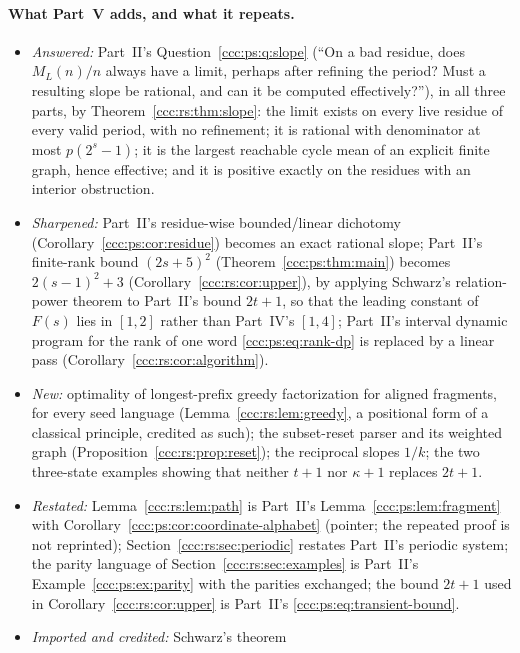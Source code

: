 \documentclass[11pt,letterpaper]{article}
\theoremstyle{definition}
\theoremstyle{remark}
\begin{document}
\paragraph{What Part~V adds, and what it repeats.}
\begin{itemize}[leftmargin=1.4em,itemsep=1pt]
\item \emph{Answered:} Part~II's Question~\ref{ccc:ps:q:slope} (``On a bad
 residue, does $M_L(n)/n$ always have a limit, perhaps after refining the
 period? Must a resulting slope be rational, and can it be computed
 effectively?''), in all three parts, by Theorem~\ref{ccc:rs:thm:slope}: the
 limit exists on every live residue of every valid period, with no
 refinement; it is rational with denominator at most $p(2^s-1)$; it is the
 largest reachable cycle mean of an explicit finite graph, hence effective;
 and it is positive exactly on the residues with an interior obstruction.
\item \emph{Sharpened:} Part~II's residue-wise bounded/linear dichotomy
 (Corollary~\ref{ccc:ps:cor:residue}) becomes an exact rational slope;
 Part~II's finite-rank bound $(2s+5)^2$ (Theorem~\ref{ccc:ps:thm:main})
 becomes $2(s-1)^2+3$ (Corollary~\ref{ccc:rs:cor:upper}), by applying
 Schwarz's relation-power theorem to Part~II's bound $2t+1$, so that the
 leading constant of $F(s)$ lies in $[1,2]$ rather than Part~IV's $[1,4]$;
 Part~II's interval dynamic program for the rank of one word
 \eqref{ccc:ps:eq:rank-dp} is replaced by a linear pass
 (Corollary~\ref{ccc:rs:cor:algorithm}).
\item \emph{New:} optimality of longest-prefix greedy factorization for
 aligned fragments, for every seed language (Lemma~\ref{ccc:rs:lem:greedy},
 a positional form of a classical principle, credited as such); the
 subset-reset parser and its weighted graph
 (Proposition~\ref{ccc:rs:prop:reset}); the reciprocal slopes $1/k$; the two
 three-state examples showing that neither $t+1$ nor $\kappa+1$ replaces
 $2t+1$.
\item \emph{Restated:} Lemma~\ref{ccc:rs:lem:path} is Part~II's
 Lemma~\ref{ccc:ps:lem:fragment} with
 Corollary~\ref{ccc:ps:cor:coordinate-alphabet} (pointer; the repeated proof
 is not reprinted); Section~\ref{ccc:rs:sec:periodic} restates Part~II's
 periodic system; the parity language of Section~\ref{ccc:rs:sec:examples}
 is Part~II's Example~\ref{ccc:ps:ex:parity} with the parities exchanged;
 the bound $2t+1$ used in Corollary~\ref{ccc:rs:cor:upper} is Part~II's
 \eqref{ccc:ps:eq:transient-bound}.
\item \emph{Imported and credited:} Schwarz's theorem

\end{itemize}
\end{document}

